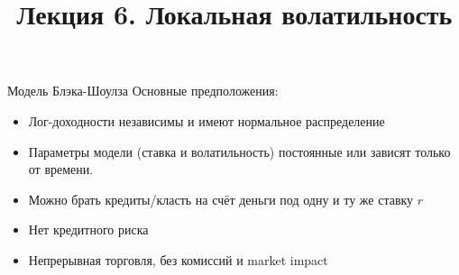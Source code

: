 \documentclass[aspectratio=169]{beamer}
\title[Модели стохастической волатильности]{Лекция 6. Локальная волатильность} %
\begin{document}
\begin{frame}
\titlepage 
\end{frame}

\begin{frame}{Модель Блэка-Шоулза}
    Основные предположения:
    \begin{itemize}
        \item Лог-доходности независимы и имеют нормальное распределение
        \item Параметры модели (ставка и волатильность) постоянные или зависят только от времени.
        \item Можно брать кредиты/класть на счёт деньги под одну и ту же ставку $r$
        \item Нет кредитного риска
        \item Непрерывная торговля, без комиссий и market impact
    \end{itemize}
\end{frame}
\end{document}
